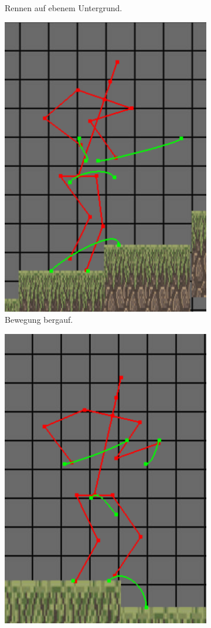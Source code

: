 \begin{figure}
\begin{subfigure}[t]{.4\linewidth}
        \caption{Rennen auf ebenem Untergrund.}
        \label{even_fast}
    \end{subfigure}
    \begin{subfigure}[t]{.4\linewidth}
        \centering
        \includegraphics[width=0.75\linewidth]{images/going_up3.png}
        \caption{Bewegung bergauf.}
        \label{uphill}
    \end{subfigure}
    \begin{subfigure}[t]{.4\linewidth}
        \centering
        \includegraphics[width=0.75\linewidth]{images/going_down1.png}

\end{subfigure}
\end{figure}
